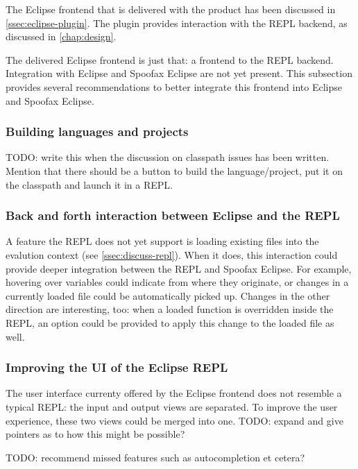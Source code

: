 The Eclipse frontend that is delivered with the product has been discussed in
\cref{ssec:eclipse-plugin}. The plugin provides interaction with the REPL
backend, as discussed in \cref{chap:design}.

The delivered Eclipse frontend is just that: a frontend to the REPL backend.
Integration with Eclipse and Spoofax Eclipse are not yet present. This
subsection provides several recommendations to better integrate this frontend
into Eclipse and Spoofax Eclipse.

\subsubsection{Building languages and projects}

TODO: write this when the discussion on classpath issues has been written.
Mention that there should be a button to build the language/project, put it on
the classpath and launch it in a REPL.

\subsubsection{Back and forth interaction between Eclipse and the REPL}

A feature the REPL does not yet support is loading existing files into the
evalution context (see \cref{ssec:discuss-repl}). When it does, this interaction
could provide deeper integration between the REPL and Spoofax Eclipse. For
example, hovering over variables could indicate from where they originate, or
changes in a currently loaded file could be automatically picked up. Changes in
the other direction are interesting, too: when a loaded function is overridden
inside the REPL, an option could be provided to apply this change to the loaded
file as well.

\subsubsection{Improving the UI of the Eclipse REPL}

The user interface currenty offered by the Eclipse frontend does not resemble a
typical REPL: the input and output views are separated. To improve the user
experience, these two views could be merged into one. TODO: expand and give
pointers as to how this might be possible?

TODO: recommend missed features such as autocompletion et cetera?

